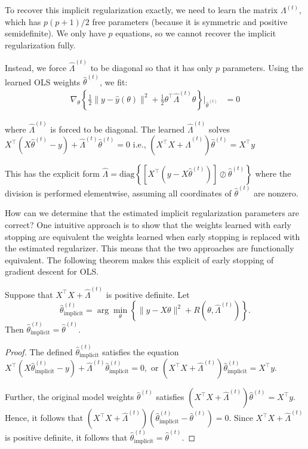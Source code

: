 \documentclass[10pt]{article}
\begin{document}
To recover this implicit regularization exactly, we need to learn the matrix $\Lambda^{(t)}$, which has $p(p+1)/2$ free parameters (because it is symmetric and positive semidefinite).
We only have $p$ equations, so we cannot recover the implicit regularization fully. 

Instead, we force $\hat{\Lambda}^{(t)}$ to be diagonal so that it has only $p$ parameters.
Using the learned OLS weights $\hat{\theta}^{(t)}$, we fit:
\begin{align}
    \nabla_\theta \left\{ \frac{1}{2} \|{y} - {\hat{y}}({\theta})\|^2 + \frac{1}{2} \theta^\top \hat{\Lambda}^{(t)} \theta \right\}\bigg|_{\hat{\theta}^{(t)}} &= 0
    \label{eq:diag-bias-fit}
\end{align}

where $\hat{\Lambda}^{(t)}$ is forced to be diagonal. 
The learned $\hat{\Lambda}^{(t)}$ solves
\(
X^\top (X \hat{\theta}^{(t)} - y) + \hat{\Lambda}^{(t)} \hat{\theta}^{(t)} = 0
\)
i.e.,
\(
(X^\top X + \hat{\Lambda}^{(t)}) \hat{\theta}^{(t)} = X^\top y 
\)

This has the explicit form
\(
\hat{\Lambda} = \mathrm{diag}\left\{[X^\top (y - X \hat{\theta}^{(t)})] \oslash {\hat{\theta}^{(t)}}\right\}
\)
where the division is performed elementwise, 
assuming all coordinates of $\hat{\theta}^{(t)}$ are nonzero.

How can we determine that the estimated implicit regularization parameters are correct? One intuitive approach is to show that the weights learned with early stopping are equivalent the weights learned when early stopping is replaced with the estimated regularizer. This means that the two approaches are functionally equivalent. The following theorem makes this explicit of early stopping of gradient descent for OLS.

\begin{theorem}
Suppose that 
$X^\top X + \hat{\Lambda}^{(t)}$ is positive definite.
Let 
\[
\hat{\theta}_{\text{implicit}}^{(t)} = \arg\min_{\theta} \left\{ \|y - X \theta\|^2 + R(\theta, \hat{\Lambda}^{(t)}) \right\}.
\]
Then
\(
\hat{\theta}_{\text{implicit}}^{(t)} = \hat{\theta}^{(t)}
\).
\end{theorem}

\begin{proof}
     The defined $\hat{\theta}_{\text{implicit}}^{(t)}$ satisfies the equation
\(
X^\top (X \hat{\theta}_{\text{implicit}}^{(t)} - y) + \hat{\Lambda}^{(t)} \hat{\theta}_{\text{implicit}}^{(t)} = 0,
\)
or
\(
(X^\top X + \hat{\Lambda}^{(t)}) \hat{\theta}_{\text{implicit}}^{(t)} = X^\top y.
\)

Further, the original model weights $\hat{\theta}^{(t)}$ satisfies 
\(
(X^\top X + \hat{\Lambda}^{(t)}) \hat{\theta}^{(t)} = X^\top y.
\)
Hence, 
it follows that 
\(
(X^\top X + \hat{\Lambda}^{(t)}) (\hat{\theta}_{\text{implicit}}^{(t)} - \hat{\theta}^{(t)}) = 0.
\)
Since
$X^\top X + \hat{\Lambda}^{(t)}$ is positive definite, it follows that \(
\hat{\theta}_{\text{implicit}}^{(t)} = \hat{\theta}^{(t)}
\).
\end{proof}
\end{document}
